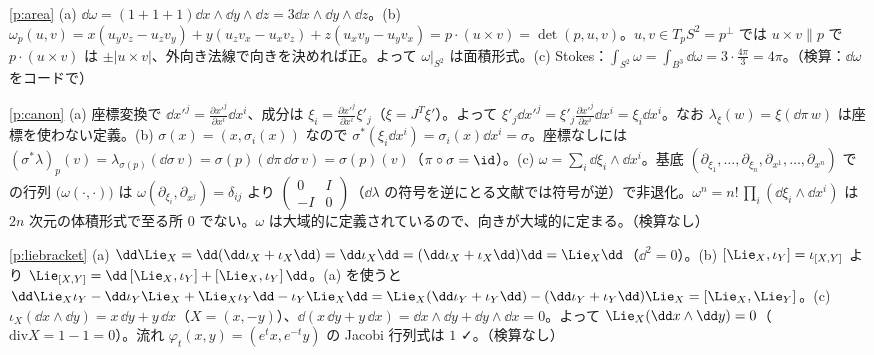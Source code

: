\begin{sol}{\ref{p:area}}
(a) $\dd\omega=(1+1+1)\dd x\wedge\dd y\wedge\dd z=3\dd x\wedge\dd y\wedge\dd z$。(b) $\omega_p(u,v)=x(u_yv_z-u_zv_y)+y(u_zv_x-u_xv_z)+z(u_xv_y-u_yv_x)=p\cdot(u\times v)=\det(p,u,v)$。$u,v\in T_pS^2=p^\perp$ では $u\times v\parallel p$ で $p\cdot(u\times v)$ は $\pm|u\times v|$、外向き法線で向きを決めれば正。よって $\omega|_{S^2}$ は面積形式。(c) Stokes：$\int_{S^2}\omega=\int_{B^3}\dd\omega=3\cdot\frac{4\pi}3=4\pi$。（検算：$\dd\omega$ をコードで）
\end{sol}
\begin{sol}{\ref{p:canon}}
(a) 座標変換で $\dd x'^j=\frac{\partial x'^j}{\partial x^i}\dd x^i$、成分は $\xi_i=\frac{\partial x'^j}{\partial x^i}\xi'_j$（$\xi=J^T\xi'$）。よって $\xi'_j\dd x'^j=\xi'_j\frac{\partial x'^j}{\partial x^i}\dd x^i=\xi_i\dd x^i$。なお $\lambda_\xi(w)=\xi(\dd\pi\,w)$ は座標を使わない定義。(b) $\sigma(x)=(x,\sigma_i(x))$ なので $\sigma^*(\xi_i\dd x^i)=\sigma_i(x)\dd x^i=\sigma$。座標なしには $(\sigma^*\lambda)_p(v)=\lambda_{\sigma(p)}(\dd\sigma\,v)=\sigma(p)(\dd\pi\,\dd\sigma\,v)=\sigma(p)(v)$（$\pi\circ\sigma=\id$）。(c) $\omega=\sum_i\dd\xi_i\wedge\dd x^i$。基底 $(\partial_{\xi_1},\dots,\partial_{\xi_n},\partial_{x^1},\dots,\partial_{x^n})$ での行列 $\bigl(\omega(\cdot,\cdot)\bigr)$ は $\omega(\partial_{\xi_i},\partial_{x^j})=\delta_{ij}$ より $\begin{pmatrix}0&I\\-I&0\end{pmatrix}$（$\dd\lambda$ の符号を逆にとる文献では符号が逆）で非退化。$\omega^n=n!\,\prod_i(\dd\xi_i\wedge\dd x^i)$ は $2n$ 次元の体積形式で至る所 $0$ でない。$\omega$ は大域的に定義されているので、向きが大域的に定まる。（検算なし）
\end{sol}

\begin{sol}{\ref{p:liebracket}}
(a) $\dd\Lie_X=\dd(\dd\iota_X+\iota_X\dd)=\dd\iota_X\dd=(\dd\iota_X+\iota_X\dd)\dd=\Lie_X\dd$（$\dd^2=0$）。(b) $[\Lie_X,\iota_Y]=\iota_{[X,Y]}$ より $\Lie_{[X,Y]}=\dd\,[\Lie_X,\iota_Y]+[\Lie_X,\iota_Y]\,\dd$。(a) を使うと $\dd\Lie_X\iota_Y-\dd\iota_Y\Lie_X+\Lie_X\iota_Y\dd-\iota_Y\Lie_X\dd=\Lie_X(\dd\iota_Y+\iota_Y\dd)-(\dd\iota_Y+\iota_Y\dd)\Lie_X=[\Lie_X,\Lie_Y]$。(c) $\iota_X(\dd x\wedge\dd y)=x\,\dd y+y\,\dd x$（$X=(x,-y)$）、$\dd(x\,\dd y+y\,\dd x)=\dd x\wedge\dd y+\dd y\wedge\dd x=0$。よって $\Lie_X(\dd x\wedge\dd y)=0$（$\mathrm{div}X=1-1=0$）。流れ $\varphi_t(x,y)=(e^tx,e^{-t}y)$ の Jacobi 行列式は $1$ ✓。（検算なし）
\end{sol}

